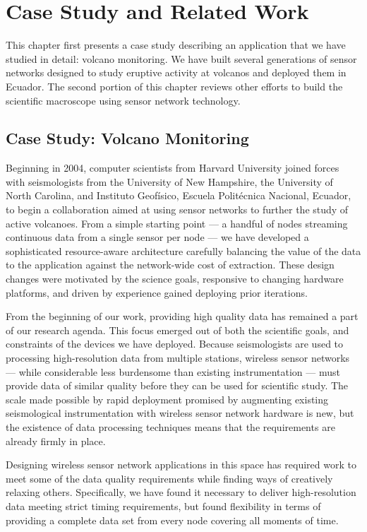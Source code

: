 \chapter{Case Study and Related Work}
\label{chapter-background}

This chapter first presents a case study describing an application that we
have studied in detail: volcano monitoring. We have built several generations
of sensor networks designed to study eruptive activity at volcanos and
deployed them in Ecuador. The second portion of this chapter reviews other
efforts to build the scientific macroscope using sensor network technology.

\section{Case Study: Volcano Monitoring}

Beginning in 2004, computer scientists from Harvard University joined forces
with seismologists from the University of New Hampshire, the University of
North Carolina, and Instituto Geof\'{i}sico, Escuela Polit\'{e}cnica
Nacional, Ecuador, to begin a collaboration aimed at using sensor networks to
further the study of active volcanoes. From a simple starting point --- a
handful of nodes streaming continuous data from a single sensor per node ---
we have developed a sophisticated resource-aware architecture carefully
balancing the value of the data to the application against the network-wide
cost of extraction. These design changes were motivated by the science goals,
responsive to changing hardware platforms, and driven by experience gained
deploying prior iterations. 

From the beginning of our work, providing high quality data has remained a
part of our research agenda. This focus emerged out of both the scientific
goals, and constraints of the devices we have deployed. Because seismologists
are used to processing high-resolution data from multiple stations, wireless
sensor networks --- while considerable less burdensome than existing
instrumentation --- must provide data of similar quality before they can be
used for scientific study. The scale made possible by rapid deployment
promised by augmenting existing seismological instrumentation with wireless
sensor network hardware is new, but the existence of data processing
techniques means that the requirements are already firmly in place.

Designing wireless sensor network applications in this space has required
work to meet some of the data quality requirements while finding ways of
creatively relaxing others. Specifically, we have found it necessary to
deliver high-resolution data meeting strict timing requirements, but found
flexibility in terms of providing a complete data set from every node
covering all moments of time.

